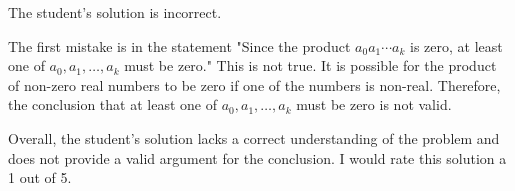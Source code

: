 The student's solution is incorrect.

The first mistake is in the statement "Since the product $a_0 a_1 \cdots a_k$ is zero, at least one of $a_0, a_1, \ldots, a_k$ must be zero." This is not true. It is possible for the product of non-zero real numbers to be zero if one of the numbers is non-real. Therefore, the conclusion that at least one of $a_0, a_1, \ldots, a_k$ must be zero is not valid.

Overall, the student's solution lacks a correct understanding of the problem and does not provide a valid argument for the conclusion. I would rate this solution a 1 out of 5.
